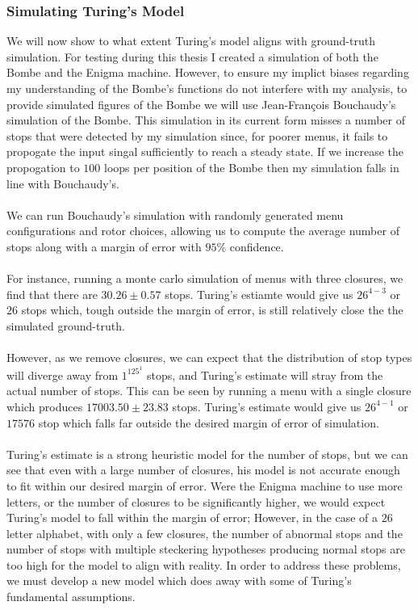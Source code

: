 \subsubsection{Simulating Turing's Model}
We will now show to what extent Turing's model aligns with ground-truth simulation. For testing during this thesis I created a simulation of both the Bombe and the Enigma machine. However, to ensure my implict biases regarding my understanding of the Bombe's functions do not interfere with my analysis, to provide simulated figures of the Bombe we will use Jean-François Bouchaudy's simulation of the Bombe. This simulation in its current form misses a number of stops that were detected by my simulation since, for poorer menus, it fails to propogate the input singal sufficiently to reach a steady state. If we increase the propogation to $100$ loops per position of the Bombe then my simulation falls in line with Bouchaudy's.
\\\\We can run Bouchaudy's simulation with randomly generated menu configurations and rotor choices, allowing us to compute the average number of stops along with a margin of error with $95\%$ confidence.
\\\\ For instance, running a monte carlo simulation of menus with three closures, we find that there are $30.26\pm0.57$ stops. Turing's estiamte would give us $26^{4-3}$ or $26$ stops which, tough outside the margin of error, is still relatively close the the simulated ground-truth.
\\\\However, as we remove closures, we can expect that the distribution of stop types will diverge away from $1^125^1$ stops, and Turing's estimate will stray from the actual number of stops. This can be seen by running a menu with a single closure which produces $17003.50\pm23.83$ stops. Turing's estimate would give us $26^{4-1}$ or $17576$ stop which falls far outside the desired margin of error of simulation.
\\\\Turing's estimate is a strong heuristic model for the number of stops, but we can see that even with a large number of closures, his model is not accurate enough to fit within our desired margin of error. Were the Enigma machine to use more letters, or the number of closures to be significantly higher, we would expect Turing's model to fall within the margin of error; However, in the case of a $26$ letter alphabet, with only a few closures, the number of abnormal stops and the number of stops with multiple steckering hypotheses producing normal stops are too high for the model to align with reality. In order to address these problems, we must develop a new model which does away with some of Turing's fundamental assumptions.
